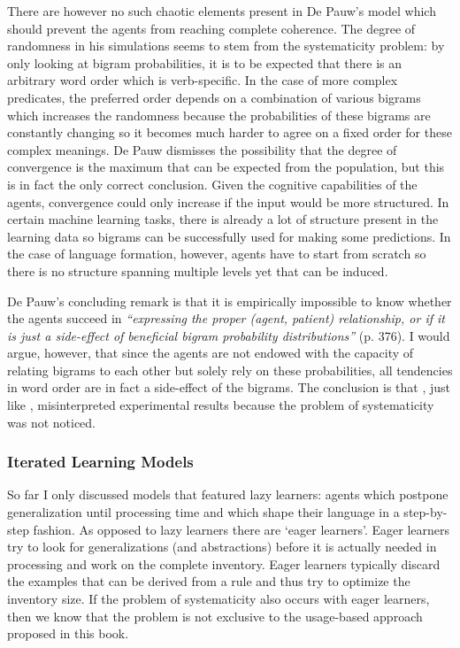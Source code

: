 There are however no such chaotic elements present in De Pauw's model which should prevent the agents from reaching complete coherence. The degree of randomness in his simulations seems to stem from the systematicity problem: by only looking at bigram probabilities, it is to be expected that there is an arbitrary word order which is verb-specific. In the case of more complex predicates, the preferred order depends on a combination of various bigrams which increases the randomness because the probabilities of these bigrams are constantly changing so it becomes much harder to agree on a fixed order for these complex meanings. De Pauw dismisses the possibility that the degree of convergence is the maximum that can be expected from the population, but this is in fact the only correct conclusion. Given the cognitive capabilities of the agents, convergence could only increase if the input would be more structured. In certain machine learning tasks, there is already a lot of structure present in the learning data so bigrams can be successfully used for making some predictions. In the case of language formation, however, agents have to start from scratch so there is no structure spanning multiple levels yet that can be induced.

De Pauw's concluding remark is that it is empirically impossible to know whether the agents succeed in {\em ``expressing the proper (agent, patient) relationship, or if it is just a side-effect of beneficial bigram probability distributions''} (p. 376). I would argue, however, that since the agents are not endowed with the capacity of relating bigrams to each other but solely rely on these probabilities, all tendencies in word order are in fact a side-effect of the bigrams. The conclusion is that \citet{depauw02grael}, just like \citet{batali02negotiation}, misinterpreted experimental results because the problem of systematicity was not noticed.


\subsubsection{Iterated Learning Models}
 So far I only discussed models that featured lazy learners: agents which postpone generalization until processing time and which shape their language in a step-by-step fashion. As opposed to lazy learners there are `eager learners'. Eager learners try to look for generalizations (and abstractions) before it is actually needed in processing and work on the complete inventory. Eager learners typically discard the examples that can be derived from a rule and thus try to optimize the inventory size. If the problem of systematicity also occurs with eager learners, then we know that the problem is not exclusive to the usage-based approach proposed in this book. 

